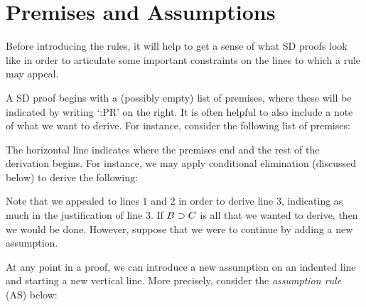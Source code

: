 \section{Premises and Assumptions}
\label{sec:PremiseAssumption}

Before introducing the rules, it will help to get a sense of what SD proofs look like in order to articulate some important constraints on the lines to which a rule may appeal.

A SD proof begins with a (possibly empty) list of premises, where these will be indicated by writing `:PR' on the right.
It is often helpful to also include a note of what we want to derive.
For instance, consider the following list of premises:
\begin{fitchproof}
   \pr{}
   \pr{}
\end{fitchproof}
The horizontal line indicates where the premises end and the rest of the derivation begins.
For instance, we may apply conditional elimination (discussed below) to derive the following:
\begin{fitchproof}
   \pr{}
   \pr{}
   
\end{fitchproof}
Note that we appealed to lines $1$ and $2$ in order to derive line $3$, indicating as much in the justification of line $3$. 
If $B \supset C$ is all that we wanted to derive, then we would be done. 
However, suppose that we were to continue by adding a new assumption.
\begin{fitchproof}
   \pr{}
   \pr{}
   
  \open
     \as{}
  \close
\end{fitchproof}
At any point in a proof, we can introduce a new assumption on an indented line and starting a new vertical line.
More precisely, consider the \textit{assumption rule} (AS) below:
